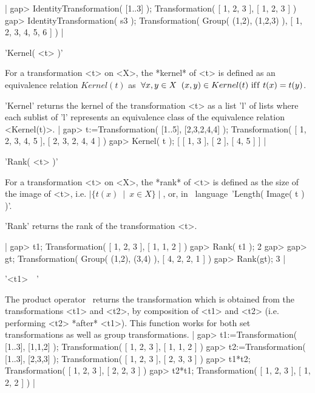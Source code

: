 |  gap> IdentityTransformation( [1..3] );
  Transformation( [ 1, 2, 3 ], [ 1, 2, 3 ] )
  gap> IdentityTransformation( s3 );
  Transformation( Group( (1,2), (1,2,3) ), [ 1, 2, 3, 4, 5, 6 ] )
|

   
'Kernel( <t> )'

For a transformation <t> on <X>, the *kernel* of <t> is defined as an 
equivalence relation $Kernel(t)$ as\:\ $\forall x,y \in X\:\ (x,y) \in 
Kernel(t)\ {\rm if\/f}\ t(x) = t(y)$.

'Kernel' returns the kernel of the transformation <t> as a list 'l' 
of lists where each sublist of 'l' represents an equivalence class of the 
equivalence relation <Kernel(t)>. 
| 
  gap> t:=Transformation( [1..5], [2,3,2,4,4] );
  Transformation( [ 1, 2, 3, 4, 5 ], [ 2, 3, 2, 4, 4 ] )
  gap> Kernel( t );
  [ [ 1, 3 ], [ 2 ], [ 4, 5 ] ] 
|

   
'Rank( <t> )'

For a transformation <t> on <X>, the *rank* of <t> is defined as  
the size of the image of <t>, i.e. 
$\mid \{t(x)\ \mid \ x \in X\} \mid$,
or, in \GAP\ 
language\:\ 'Length( Image( t ) )'.

'Rank' returns the rank of the transformation <t>. 

|  gap> t1;
  Transformation( [ 1, 2, 3 ], [ 1, 1, 2 ] )
  gap> Rank( t1 );
  2
  gap>
  gap> gt;
  Transformation( Group( (1,2), (3,4) ), [ 4, 2, 2, 1 ] )
  gap> Rank(gt);
  3
|

\Section{Operations for transformations}
   
'<t1>\ \*\ <t2>'

The product operator \*\ returns the transformation which is obtained 
from the transformations <t1> and <t2>, by composition of <t1> 
and <t2> (i.e. performing <t2> *after* <t1>). This function 
works for both set transformations as well as group transformations.
| 
  gap> t1:=Transformation( [1..3], [1,1,2] );
  Transformation( [ 1, 2, 3 ], [ 1, 1, 2 ] )
  gap> t2:=Transformation( [1..3], [2,3,3] );
  Transformation( [ 1, 2, 3 ], [ 2, 3, 3 ] )
  gap> t1*t2;
  Transformation( [ 1, 2, 3 ], [ 2, 2, 3 ] )
  gap> t2*t1;
  Transformation( [ 1, 2, 3 ], [ 1, 2, 2 ] )
|

